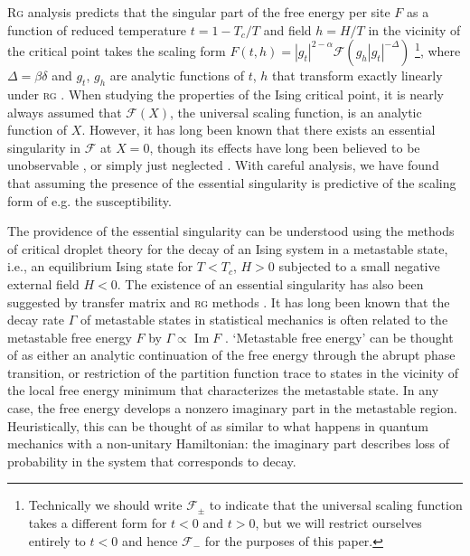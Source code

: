 \documentclass[aps,prl,reprint]{revtex4-1}
\def\im{\mathop{\mathrm{Im}}\nolimits}
\begin{document}
\textsc{Rg} analysis predicts that the singular part of the free energy per
site $F$ as a function of reduced temperature $t=1-T_c/T$ and field $h=H/T$ in
the vicinity of the critical point takes the scaling form
$F(t,h)=|g_t|^{2-\alpha}\mathcal F(g_h|g_t|^{-\Delta})$ \footnote{Technically
we should write $\mathcal F_{\pm}$ to indicate that the universal scaling
function takes a different form for $t<0$ and $t>0$, but we will restrict
ourselves entirely to $t<0$ and hence $\mathcal F_-$ for the purposes of this
paper.}, where $\Delta=\beta\delta$ and $g_t$, $g_h$ are analytic functions of
$t$, $h$ that transform exactly linearly under \textsc{rg}
\cite{cardy.1996.scaling,aharony.1983.fields}. When studying the properties of
the Ising critical point, it is nearly always assumed that $\mathcal F(X)$,
the universal scaling function, is an analytic function of $X$. However, it
has long been known that there exists an essential singularity in $\mathcal F$
at $X=0$, though its effects have long been believed to be unobservable
\cite{fisher.1967.condensation}, or simply just neglected
\cite{guida.1997.3dising,schofield.1969.parametric,schofield.1969.correlation,caselle.2001.critical,josephson.1969.equation,fisher.1999.trigonometric}.
With careful analysis, we have found that assuming the presence of the
essential singularity is predictive of the scaling form of e.g. the
susceptibility.

The providence of the essential singularity can be understood using the
methods of critical droplet theory for the decay of an Ising system in a
metastable state, i.e., an equilibrium Ising state for $T<T_c$, $H>0$
subjected to a small negative external field $H<0$. The existence of an
essential singularity has also been suggested by transfer matrix
\cite{mccraw.1978.metastability,enting.1980.investigation} and \textsc{rg}
methods \cite{klein.1976.essential}.  It has long been known that the decay
rate $\Gamma$ of metastable states in statistical mechanics is often related
to the metastable free energy $F$ by $\Gamma\propto\im F$
\cite{langer.1969.metastable,penrose.1987.rigorous,gaveau.1989.analytic,privman.1982.analytic}.
`Metastable free energy' can be thought of as either an analytic continuation
of the free energy through the abrupt phase transition, or restriction of the
partition function trace to states in the vicinity of the local free energy
minimum that characterizes the metastable state. In any case, the free energy
develops a nonzero imaginary part in the metastable region. Heuristically,
this can be thought of as similar to what happens in quantum mechanics with a
non-unitary Hamiltonian: the imaginary part describes loss of probability in
the system that corresponds to decay. 
\end{document}
